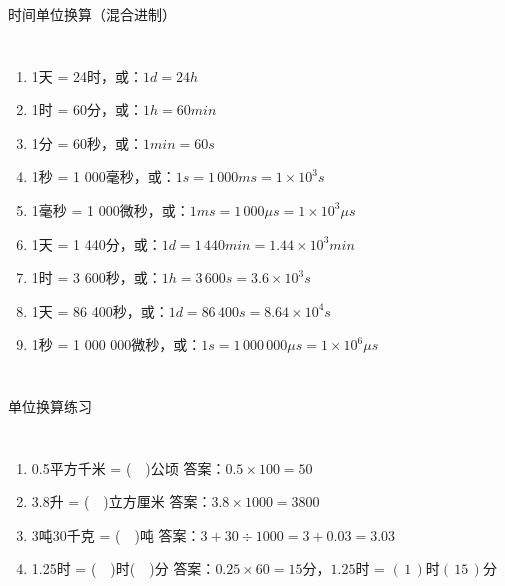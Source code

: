 \documentclass[aspectratio=169]{ctexbeamer} %
\begin{document}
\begin{frame}[t]{时间单位换算（混合进制）}
\begin{columns}
\begin{enumerate}[label={\Alph*.}]
\item 1天 = 24时，或：$1 d = 24 h$ \pause
\item 1时 = 60分，或：$1 h = 60 min$ \pause
\item 1分 = 60秒，或：$1 min = 60 s$ \pause
\item 1秒 = 1 000毫秒，或：$1 s = 1 \, 000 ms = 1 \times 10^{3} s$ \pause
\item 1毫秒 = 1 000微秒，或：$1 ms = 1 \, 000 \mu s = 1 \times 10^{3} \mu s$ \pause
\item 1天 = 1 440分，或：$1 d = 1 \, 440 min = 1.44 \times 10^{3} min$ \pause
\item 1时 = 3 600秒，或：$1 h = 3 \, 600 s = 3.6 \times 10^{3} s$ \pause
\item 1天 = 86 400秒，或：$1 d = 86 \, 400 s = 8.64 \times 10^{4} s$ \pause
\item 1秒 = 1 000 000微秒，或：$1 s = 1 \, 000 \, 000 \mu s = 1 \times 10^{6} \mu s$ \pause
\pause
\pause
\end{enumerate}
\end{columns}
\end{frame}

\begin{frame}[t]{单位换算练习}
\begin{columns}
\begin{enumerate}[label={\Alph*.}]
\item 0.5平方千米 = ($\quad$)公顷 \pause \alert{答案：$0.5 \times 100 = 50$}
\item 3.8升 = ($\quad$)立方厘米 \pause \alert{答案：$3.8 \times 1000 = 3800$}
\item 3吨30千克 = ($\quad$)吨 \pause \alert{答案：$3 + 30 \div 1000 = 3 + 0.03 = 3.03$}
\item 1.25时 = ($\quad$)时($\quad$)分 \pause \alert{答案：$0.25 \times 60 = 15$分，$1.25$时 = $(\, 1 \,)$时$(\, 15 \,)$分}
\end{enumerate}
\end{columns}
\end{frame}
\end{document}
